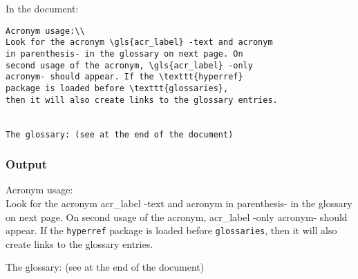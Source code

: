 In the document:
\begin{lstlisting}
Acronym usage:\\
Look for the acronym \gls{acr_label} -text and acronym
in parenthesis- in the glossary on next page. On
second usage of the acronym, \gls{acr_label} -only
acronym- should appear. If the \texttt{hyperref}
package is loaded before \texttt{glossaries},
then it will also create links to the glossary entries.


The glossary: (see at the end of the document)
\end{lstlisting}


\subsubsection{Output}

Acronym usage:\\
Look for the acronym \gls{acr_label} -text and acronym
in parenthesis- in the glossary on next page. On
second usage of the acronym, \gls{acr_label} -only
acronym- should appear. If the \texttt{hyperref}
package is loaded before \texttt{glossaries},
then it will also create links to the glossary entries.


The glossary: (see at the end of the document)



\cite{greenwade93}
\nocite{goossens93}
